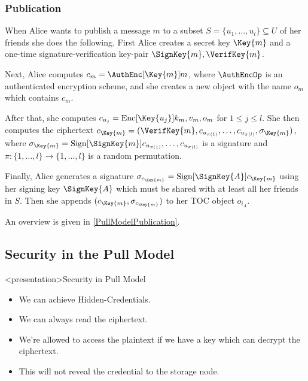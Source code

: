 \subsubsection<article>{Publication}

When Alice wants to publish a message \(m\) to a subset \(S = \{u_1, \ldots, 
  u_l\}\subseteq U\) of her friends she does the following.
First Alice creates a secret key \(\Key{m}\) and a one-time 
signature-verification key-pair \(\SignKey{m}, \VerifKey{m}\).

Next, Alice computes \(c_m = \AuthEnc[\Key{m}]{ m }\), where \(\AuthEncOp\) is 
an authenticated encryption scheme, and she creates a new object with the name 
\(o_m\) which contains \(c_m\).

After that, she computes \(c_{u_j} = \Enc[\Key{u_j}]{ k_m, v_m, o_m }\) for 
\(1\leq j\leq l\).
She then computes the ciphertext \(c_{\Key{m}} = (\VerifKey{m}, c_{u_{\pi(1)}}, 
  \ldots, c_{u_{\pi(l)}}, \sigma_{\Key{m}})\), where \(\sigma_{\Key{m}} 
  = \Sign[\SignKey{m}]{ c_{u_{\pi(1)}}, \ldots, c_{u_{\pi(l)}} }\) is 
a signature and \(\pi\colon \{1,\ldots,l\}\to \{1,\ldots,l\}\) is a random 
permutation.

Finally, Alice generates a signature \(\sigma_{c_{\Key{m}}} 
  = \Sign[\SignKey{A}]{ c_{\Key{m}} }\) using her signing key \(\SignKey{A}\) 
which must be shared with at least all her friends in \(S\).
Then she appends \((c_{\Key{m}}, \sigma_{c_{\Key{m}}})\) to her \ac{TOC} object 
\(o_{i_A}\).

An overview is given in \cref{PullModelPublication}.

\subsection<article>{Security in the Pull Model}\label{PullModelSec}

\begin{frame}<presentation>{Security in Pull Model}
  \begin{itemize}

    \item We can achieve Hidden-Credentials.

    \item We can always read the ciphertext.

    \item We're allowed to access the plaintext if we have a key which can 
      decrypt the ciphertext.

    \item This will not reveal the credential to the storage node.

  \end{itemize}
\end{frame}

